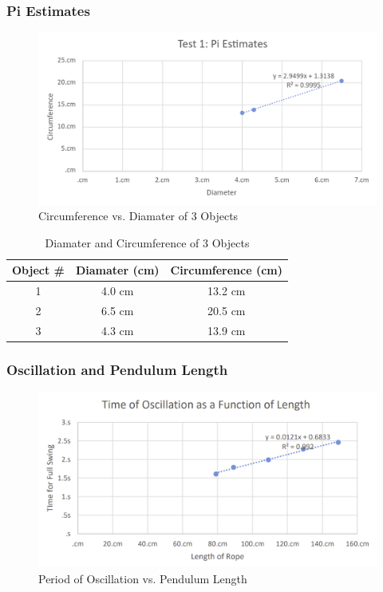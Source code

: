 \documentclass{article}
\begin{document}
\subsubsection{Pi Estimates}
\begin{figure}[H]
    \includegraphics[width=16cm]{lab1_plot1.png}
    \caption{Circumference vs. Diamater of 3 Objects}
    \label{plot:1}
\end{figure}

\setlength{\tabcolsep}{18pt}
\renewcommand{\arraystretch}{1.5}
\begin{table}[H]
\centering
\begin{tabular}{|c|c|c|}
    \hline
    \rowcolor{black}
    \color{white} Object \# & \color{white} Diamater (cm) & \color{white} Circumference (cm) \\
    \hline
    1 & 4.0 cm & 13.2 cm \\
    \hline
    2 & 6.5 cm & 20.5 cm \\
    \hline
    3 & 4.3 cm & 13.9 cm \\
    
    \hline
\end{tabular} 
\caption{Diamater and Circumference of 3 Objects}
\end{table}

\subsubsection{Oscillation and Pendulum Length}
\begin{figure}[H]
    \includegraphics*[width=16cm]{lab1_plot3.png}
    \caption{Period of Oscillation vs. Pendulum Length}
    \label{plot:2}
\end{figure}
\end{document}
